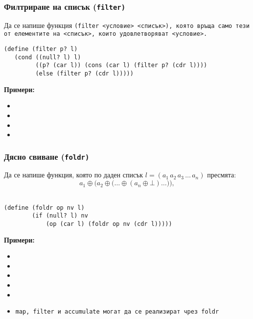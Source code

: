 \documentclass{beamer}
\begin{document}
\begin{frame}[fragile]
  \frametitle{Филтриране на списък (\tt{filter})}

  Да се напише функция \tt{(filter }<условие> <списък>\tt), която връща само тези от елементите на <списък>, които удовлетворяват <условие>.
\pause
\small
\begin{lstlisting}
(define (filter p? l)
   (cond ((null? l) l)
         ((p? (car l)) (cons (car l) (filter p? (cdr l))))
         (else (filter p? (cdr l)))))
\end{lstlisting}
\pause
  \textbf{Примери:}
  \begin{itemize}[<+->]
  \item {}
  \item {}
  \item \scriptsize{}
  \item {}
  \end{itemize}

\end{frame}

\begin{frame}[fragile]
  \frametitle{Дясно свиване (\tt{foldr})}

  Да се напише функция, която по даден списък $l = (a_1\,a_2\,a_3\,\ldots\,a_n)$ пресмята:
  \begin{equation*}
    a_1 \oplus \Big(a_2 \oplus \big(\ldots \oplus (a_n \oplus \bot) \ldots\big)\Big),
  \end{equation*}\\[-0.5em]
  \pause
\begin{lstlisting}
(define (foldr op nv l)
        (if (null? l) nv
            (op (car l) (foldr op nv (cdr l)))))
\end{lstlisting}
  \pause
  \textbf{Примери:}
  \small
  \begin{itemize}[<+->]
  \item {}
  \item {}
  \item {}
  \item {}
  \item {}
  \item \tt{map}, \tt{filter} и \tt{accumulate} могат да се реализират чрез \tt{foldr}
  \end{itemize}

\end{frame}
\end{document}
